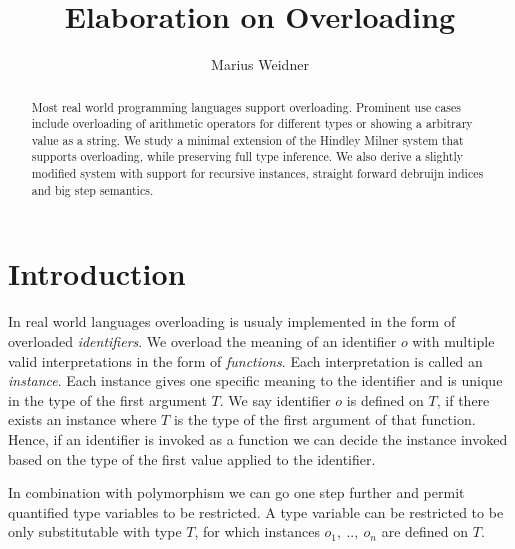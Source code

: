 \documentclass[runningheads]{llncs}
\begin{document}
\title{Elaboration on Overloading}
\author{Marius Weidner}
\maketitle

\begin{abstract}
Most real world programming languages support overloading. 
Prominent use cases include overloading of arithmetic operators for different types or showing a arbitrary value as a string. 
We study a minimal extension of the Hindley Milner system that supports overloading, while preserving full type inference. 
We also derive a slightly modified system with support for recursive instances, straight forward debruijn indices and big step semantics.
\end{abstract}

\section{Introduction}
In real world languages overloading is usualy implemented in the form of overloaded \emph{identifiers}.
We overload the meaning of an identifier $o$ with multiple valid interpretations in the form of \emph{functions}. 
Each interpretation is called an \emph{instance}.
Each instance gives one specific meaning to the identifier and is unique in the type of the first argument $T$. 
We say identifier $o$ is defined on $T$, if there exists an instance where $T$ is the type of the first argument of that function.
Hence, if an identifier is invoked as a function we can decide the instance invoked based on the type of the first value applied to the identifier. 

In combination with polymorphism we can go one step further and permit quantified type variables to be restricted. 
A type variable can be restricted to be only substitutable with type $T$, for which instances $o_1, \ .., \ o_n$ are defined on $T$. 
\end{document}
